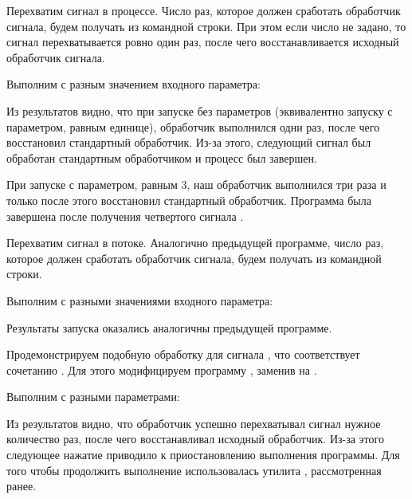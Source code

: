 Перехватим сигнал  в процессе. Число раз, которое должен сработать обработчик сигнала, будем получать из командной строки. При этом если число не задано, то сигнал перехватывается ровно один раз, после чего восстанавливается исходный обработчик сигнала.



Выполним  с разным значением входного параметра:



Из результатов видно, что при запуске без параметров (эквивалентно запуску с параметром, равным единице), обработчик выполнился одни раз, после чего восстановил стандартный обработчик. Из-за этого, следующий сигнал  был обработан стандартным обработчиком и процесс был завершен.

При запуске с параметром, равным 3, наш обработчик выполнился три раза и только после этого восстановил стандартный обработчик. Программа была завершена после получения четвертого сигнала .

Перехватим сигнал  в потоке. Аналогично предыдущей программе, число раз, которое должен сработать обработчик сигнала, будем получать из командной строки.



Выполним  с разными значениями входного параметра:



Результаты запуска оказались аналогичны предыдущей программе.

Продемонстрируем подобную обработку для сигнала , что соответствует сочетанию . Для этого модифицируем программу , заменив  на .



Выполним с разными параметрами:



Из результатов видно, что обработчик успешно перехватывал сигнал  нужное количество раз, после чего восстанавливал исходный обработчик. Из-за этого следующее нажатие  приводило к приостановлению выполнения программы. Для того чтобы продолжить выполнение использовалась утилита , рассмотренная ранее.

